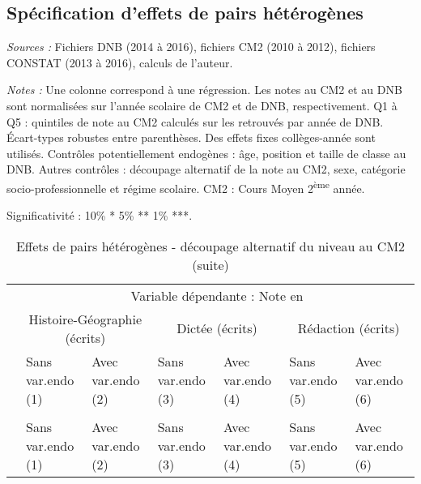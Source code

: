 \documentclass[
]{book}
\begin{document}
\hypertarget{pemodelshbcorrssmoy}{%
\subsection{Spécification d'effets de pairs hétérogènes}\label{pemodelshbcorrssmoy}}

\begingroup\fontsize{8}{10}\selectfont

\begin{ThreePartTable}
\begin{TableNotes}
\item \textit{Sources :} Fichiers DNB (2014 à 2016), fichiers CM2 (2010 à 2012), fichiers CONSTAT (2013 à 2016), calculs de l'auteur.
\item \textit{Notes :} Une colonne correspond à une régression. Les notes au CM2 et au DNB sont normalisées sur l'année scolaire de CM2 et de DNB, respectivement. Q1 à Q5 : quintiles de note au CM2 calculés sur les retrouvés par année de DNB. Écart-types robustes entre parenthèses. Des effets fixes collèges-année sont utilisés. Contrôles potentiellement endogènes : âge, position et taille de classe au DNB. Autres contrôles : découpage alternatif de la note au CM2, sexe, catégorie socio-professionnelle et régime scolaire. CM2 : Cours Moyen 2\textsuperscript{ème} année.
\item Significativité : 10\% * 5\% ** 1\% ***.
\end{TableNotes}
\begin{longtable}[t]{lllllll}
\caption{\label{tab:pemodelshbcorrssmoy}Effets de pairs hétérogènes - découpage alternatif du niveau au CM2}\\
\toprule
\multicolumn{1}{c}{} & \multicolumn{6}{c}{Variable dépendante : Note en} \\
\cmidrule(l{3pt}r{3pt}){2-7}
\multicolumn{1}{c}{} & \multicolumn{2}{c}{Histoire-Géographie (écrits)} & \multicolumn{2}{c}{Dictée (écrits)} & \multicolumn{2}{c}{Rédaction (écrits)} \\
\cmidrule(l{3pt}r{3pt}){2-3} \cmidrule(l{3pt}r{3pt}){4-5} \cmidrule(l{3pt}r{3pt}){6-7}
 & \makecell{Sans var.endo \\ (1) } & \makecell{Avec var.endo \\ (2) } & \makecell{Sans var.endo \\ (3) } & \makecell{Avec var.endo \\ (4) } & \makecell{Sans var.endo \\ (5) } & \makecell{Avec var.endo \\ (6) }\\
\midrule
\endfirsthead
\caption[]{\label{tab:pemodelshbcorrssmoy}Effets de pairs hétérogènes - découpage alternatif du niveau au CM2 (suite)}\\
\toprule
 & \makecell{Sans var.endo \\ (1) } & \makecell{Avec var.endo \\ (2) } & \makecell{Sans var.endo \\ (3) } & \makecell{Avec var.endo \\ (4) } & \makecell{Sans var.endo \\ (5) } & \makecell{Avec var.endo \\ (6) }\\
\midrule
\endhead


\end{longtable}
\end{ThreePartTable}
\end{document}
